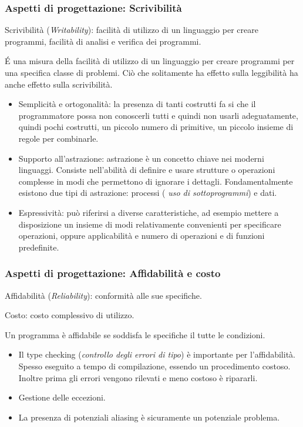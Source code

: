 \documentclass[oneside,a4paper,11pt]{book}
\theoremstyle{italicstyle}
\theoremstyle{normStyle}
\begin{document}
\subsubsection{Aspetti di progettazione: Scrivibilità}
\begin{tcolorbox}
Scrivibilità (\textit{Writability}): facilità di utilizzo di un linguaggio 
per creare programmi, facilità di analisi e verifica dei programmi.
\end{tcolorbox}
É una misura della facilità di utilizzo di un linguaggio per creare 
programmi per una specifica classe di problemi. Ciò che solitamente 
ha effetto sulla leggibilità ha anche effetto sulla scrivibilità.
\begin{itemize}
  \item Semplicità e ortogonalità: la presenza di tanti costrutti fa si 
  che il programmatore possa non conoscerli tutti e quindi non usarli 
  adeguatamente, quindi pochi costrutti, un piccolo numero di primitive,
  un piccolo insieme di regole per combinarle.
  \item Supporto all'astrazione: astrazione è un concetto chiave nei 
  moderni linguaggi. Consiste nell'abilità di definire e usare strutture o 
  operazioni complesse in modi che permettono di ignorare i dettagli. 
  Fondamentalmente esistono due tipi di astrazione: processi (\textit{ uso 
  di sottoprogrammi}) e dati.
  \item Espressività: può riferirsi a diverse caratteristiche, ad 
  esempio mettere a disposizione un insieme di modi relativamente 
  convenienti per specificare operazioni, oppure applicabilità e 
  numero di operazioni e di funzioni predefinite. 
\end{itemize}
\subsubsection{Aspetti di progettazione: Affidabilità e costo}
\begin{tcolorbox}
Affidabilità (\textit{Reliability}): conformità alle sue specifiche.
\end{tcolorbox}
\begin{tcolorbox}
Costo: costo complessivo di utilizzo.
\end{tcolorbox}
Un programma è affidabile se soddisfa le specifiche il tutte le condizioni.
\begin{itemize}
  \item Il type checking (\textit{controllo degli errori di tipo}) è 
  importante per l'affidabilità. Spesso eseguito a tempo di compilazione, 
  essendo un procedimento costoso. Inoltre prima gli errori vengono rilevati e meno 
  costoso è ripararli.
  \item Gestione delle eccezioni.
  \item La presenza di potenziali aliasing è sicuramente un potenziale 
  problema.
\end{itemize}
\end{document}
